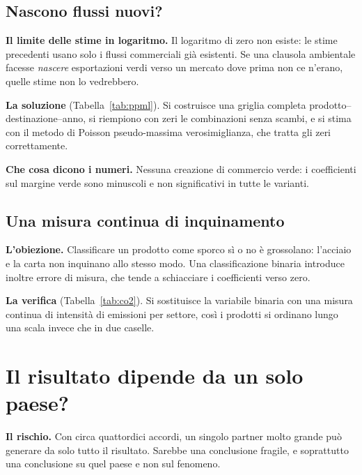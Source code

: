 \documentclass[11pt,a4paper]{article}
\begin{document}
\subsection{Nascono flussi nuovi?}

\textbf{Il limite delle stime in logaritmo.} Il logaritmo di zero non esiste: le stime
precedenti usano solo i flussi commerciali gi\`a esistenti. Se una clausola ambientale
facesse \emph{nascere} esportazioni verdi verso un mercato dove prima non ce n'erano, quelle
stime non lo vedrebbero.

\textbf{La soluzione} (Tabella~\ref{tab:ppml}). Si costruisce una griglia completa
prodotto--destinazione--anno, si riempiono con zeri le combinazioni senza scambi, e si stima
con il metodo di Poisson pseudo-massima verosimiglianza, che tratta gli zeri correttamente.

\textbf{Che cosa dicono i numeri.} Nessuna creazione di commercio verde: i coefficienti sul
margine verde sono minuscoli e non significativi in tutte le varianti.



\clearpage
\subsection{Una misura continua di inquinamento}

\textbf{L'obiezione.} Classificare un prodotto come sporco s\`i o no \`e grossolano:
l'acciaio e la carta non inquinano allo stesso modo. Una classificazione binaria introduce
inoltre errore di misura, che tende a schiacciare i coefficienti verso zero.

\textbf{La verifica} (Tabella~\ref{tab:co2}). Si sostituisce la variabile binaria con una
misura continua di intensit\`a di emissioni per settore, cos\`i i prodotti si ordinano lungo
una scala invece che in due caselle.



\clearpage
\section{Il risultato dipende da un solo paese?}

\textbf{Il rischio.} Con circa quattordici accordi, un singolo partner molto grande pu\`o
generare da solo tutto il risultato. Sarebbe una conclusione fragile, e soprattutto una
conclusione su quel paese e non sul fenomeno.
\end{document}
